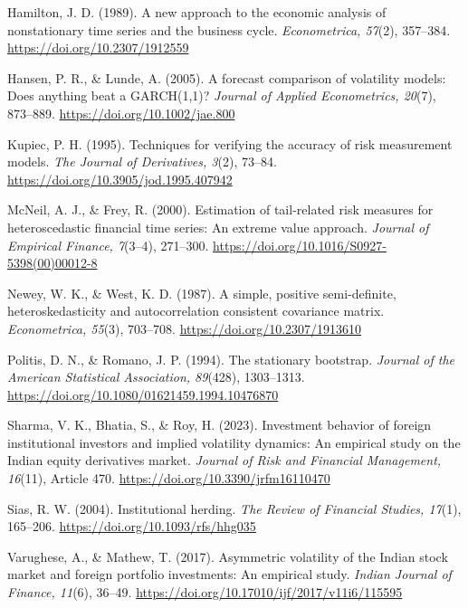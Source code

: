 \documentclass[12pt]{article}
\newenvironment{apareferences}
  {\begin{list}{}{%
     \setlength{\leftmargin}{0.5in}%
     \setlength{\itemindent}{-0.5in}%
     \setlength{\listparindent}{0pt}%
     \setlength{\itemsep}{0.5\baselineskip}}}
  {\end{list}}
\begin{document}
\begin{singlespace}
\begin{apareferences}
\item Hamilton, J. D. (1989). A new approach to the economic analysis of
nonstationary time series and the business cycle. \emph{Econometrica, 57}(2),
357--384. \url{https://doi.org/10.2307/1912559}

\item Hansen, P. R., \& Lunde, A. (2005). A forecast comparison of volatility
models: Does anything beat a GARCH(1,1)? \emph{Journal of Applied
Econometrics, 20}(7), 873--889. \url{https://doi.org/10.1002/jae.800}

\item Kupiec, P. H. (1995). Techniques for verifying the accuracy of risk
measurement models. \emph{The Journal of Derivatives, 3}(2), 73--84.
\url{https://doi.org/10.3905/jod.1995.407942}

\item McNeil, A. J., \& Frey, R. (2000). Estimation of tail-related risk
measures for heteroscedastic financial time series: An extreme value approach.
\emph{Journal of Empirical Finance, 7}(3--4), 271--300.
\url{https://doi.org/10.1016/S0927-5398(00)00012-8}

\item Newey, W. K., \& West, K. D. (1987). A simple, positive semi-definite,
heteroskedasticity and autocorrelation consistent covariance matrix.
\emph{Econometrica, 55}(3), 703--708. \url{https://doi.org/10.2307/1913610}

\item Politis, D. N., \& Romano, J. P. (1994). The stationary bootstrap.
\emph{Journal of the American Statistical Association, 89}(428), 1303--1313.
\url{https://doi.org/10.1080/01621459.1994.10476870}

\item Sharma, V. K., Bhatia, S., \& Roy, H. (2023). Investment behavior of
foreign institutional investors and implied volatility dynamics: An empirical
study on the Indian equity derivatives market. \emph{Journal of Risk and
Financial Management, 16}(11), Article 470.
\url{https://doi.org/10.3390/jrfm16110470}

\item Sias, R. W. (2004). Institutional herding. \emph{The Review of Financial
Studies, 17}(1), 165--206. \url{https://doi.org/10.1093/rfs/hhg035}

\item Varughese, A., \& Mathew, T. (2017). Asymmetric volatility of the Indian
stock market and foreign portfolio investments: An empirical study.
\emph{Indian Journal of Finance, 11}(6), 36--49.
\url{https://doi.org/10.17010/ijf/2017/v11i6/115595}

\end{apareferences}
\end{singlespace}
\end{document}
